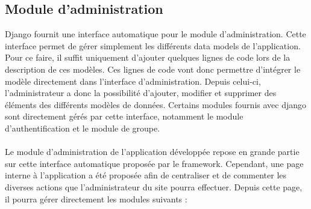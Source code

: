 \documentclass[12pt, a4paper, oneside]{article}
\begin{document}
\subsection{Module d'administration}
    \indent Django fournit une interface automatique pour le module d'administration. Cette interface permet de gérer simplement les différents data models de l'application. Pour ce faire, il suffit uniquement d'ajouter quelques lignes de code lors de la description de ces modèles. Ces lignes de code vont donc permettre d'intégrer le modèle directement dans l'interface d'administration. Depuis celui-ci, l'administrateur a donc la possibilité d'ajouter, modifier et supprimer des éléments des différents modèles de données. Certains modules fournis avec django sont directement gérés par cette interface, notamment le module d'authentification et le module de groupe.\\\\
    \indent Le module d'administration de l'application développée repose en grande partie sur cette interface automatique proposée par le framework. Cependant, une page interne à l'application a été proposée afin de centraliser et de commenter les diverses actions que l'administrateur du site pourra effectuer. Depuis cette page, il pourra gérer directement les modules suivants :
\end{document}
